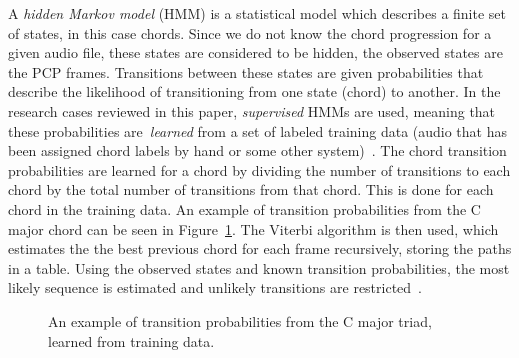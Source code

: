 \documentclass{sig-alternate}
\begin{document}
A \textit{hidden Markov model} (HMM) is a statistical model which describes a finite set of states, in this case chords. Since we do not know the chord progression for a given audio file, these states are considered to be hidden, the observed states are the PCP frames. Transitions between these states are given probabilities that describe the likelihood of transitioning from one state (chord) to another. In the research cases reviewed in this paper, \textit{supervised} HMMs are used, meaning that these probabilities are~\textit{learned} from a set of labeled training data (audio that has been assigned chord labels by hand or some other system)~\cite{wiki:hmm}. The chord transition probabilities are learned for a chord by dividing the number of transitions to each chord by the total number of transitions from that chord. This is done for each chord in the training data. An example of transition probabilities from the C major chord can be seen in Figure~\ref{fig:fig5}. The Viterbi algorithm is then used, which estimates the the best previous chord for each frame recursively, storing the paths in a table. Using the observed states and known transition probabilities, the most likely sequence is estimated and unlikely transitions are restricted~\cite{TaeMin:2014}.


\begin{figure}
\centering
{}
\caption{An example of transition probabilities from the C major triad, learned from training data.}
\label{fig:fig5}
\end{figure}



\end{document}
